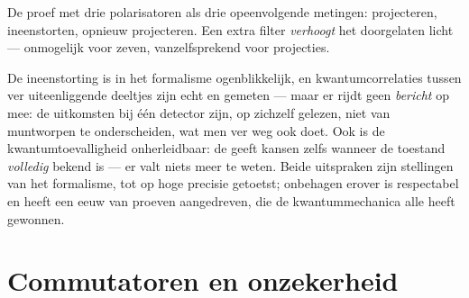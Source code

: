 \begin{omfigure}

{\small De proef met drie polarisatoren als drie opeenvolgende metingen:
projecteren, ineenstorten, opnieuw projecteren. Een extra filter
\emph{verhoogt} het doorgelaten licht --- onmogelijk voor zeven,
vanzelfsprekend voor projecties.}
\end{omfigure}

\begin{remark}\label{rem:b3:quantum-formalism:nosignal}
De ineenstorting is in het formalisme ogenblikkelijk, en kwantumcorrelaties
tussen ver uiteenliggende deeltjes zijn echt en gemeten --- maar er rijdt
geen \emph{bericht} op mee: de uitkomsten bij één detector zijn, op
zichzelf gelezen, niet van muntworpen te onderscheiden, wat men ver weg ook
doet. Ook is de kwantumtoevalligheid onherleidbaar: de  geeft
kansen zelfs wanneer de toestand \emph{volledig} bekend is --- er valt niets
meer te weten. Beide uitspraken zijn stellingen van het formalisme, tot op
hoge precisie getoetst; onbehagen erover is respectabel en heeft een eeuw
van proeven aangedreven, die de kwantummechanica alle heeft gewonnen.
\end{remark}

\section{Commutatoren en onzekerheid}


